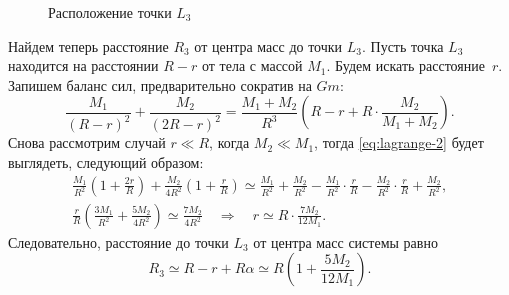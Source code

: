 \begin{wrapfigure}[4]{r}{0.4\tw}
	\centering
	\vspace{-1pc}
	\caption{Расположение точки $L_3$}
	\label{pic:larg-points-3}
\end{wrapfigure}
Найдем теперь расстояние $R_3$ от центра масс до точки $L_3$. Пусть точка $L_3$ находится на расстоянии $R - r$ от тела с массой $M_1$. Будем искать расстояние~$r$. Запишем баланс сил, предварительно сократив на $Gm$:
\begin{equation}
	\frac{M_1}{(R - r)^2} + \frac{M_2}{(2R - r)^2} =  \frac{M_1 + M_2}{R^3} \left(R - r + R \cdot \frac{M_2}{M_1 + M_2} \right).
	\label{eq:lagrange-2}
\end{equation}
Снова рассмотрим случай $r \ll R$, когда $M_2 \ll M_1$, тогда \eqref{eq:lagrange-2} будет выглядеть, следующий образом:
\begin{gather*}
	\frac{M_1}{R^2} \left(1 + \frac{2r}{R} \right) + \frac{M_2}{4R^2} \left(1 + \frac{r}{R} \right) \simeq \frac{M_1}{R^2} + \frac{M_2}{R^2} - \frac{M_1}{R^2} \cdot \frac{r}{R} - \frac{M_2}{R^2} \cdot \frac{r}{R} + \frac{M_2}{R^2},\\
	\frac{r}{R} \left( \frac{3M_1}{R^2} + \frac{5M_2}{4R^2} \right) \simeq \frac{7M_2}{4R^2} \quad \Rightarrow \quad r \simeq R \cdot \frac{7 M_2}{12 M_1}.
\end{gather*}
Следовательно, расстояние до точки $L_3$ от центра масс системы равно
\begin{equation}
	R_3 \simeq R - r + R\alpha \simeq
	R \left( 1 + \frac{ 5 M_2}{12 M_1} \right).
\end{equation}


